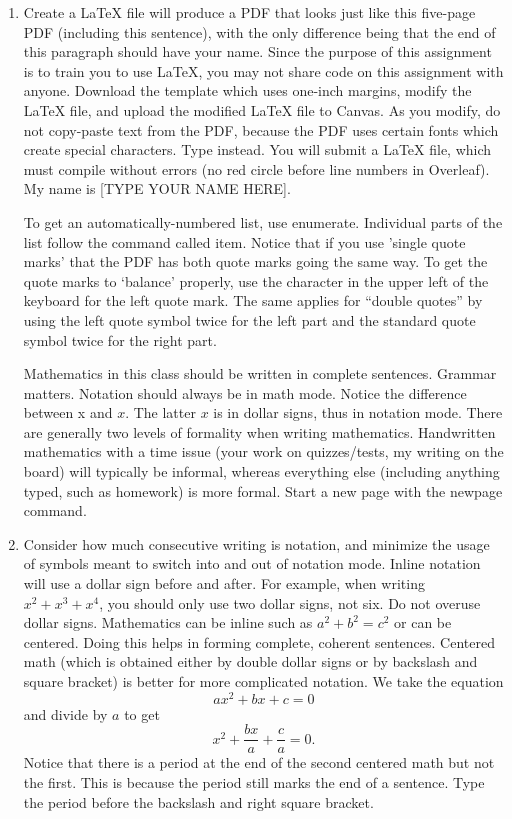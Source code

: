 \documentclass{article}
\begin{document}
\begin{enumerate}

\item Create a LaTeX file will produce a PDF that looks just like this five-page PDF (including this sentence), with the only difference being that the end of this paragraph should have your name. Since the purpose of this assignment is to train you to use LaTeX, you may not share code on this assignment with anyone. Download the template which uses one-inch margins, modify the LaTeX file, and upload the modified LaTeX file to Canvas. As you modify, do not copy-paste text from the PDF, because the PDF uses certain fonts which create special characters. Type instead. You will submit a LaTeX file, which must compile without errors (no red circle before line numbers in Overleaf). My name is [TYPE YOUR NAME HERE].

To get an automatically-numbered list, use enumerate. Individual parts of the list follow the command called item. Notice that if you use 'single quote marks' that the PDF has both quote marks going the same way. To get the quote marks to `balance' properly, use the character in the upper left of the keyboard for the left quote mark. The same applies for ``double quotes'' by using the left quote symbol twice for the left part and the standard quote symbol twice for the right part.

Mathematics in this class should be written in complete sentences. Grammar matters. Notation should always be in math mode. Notice the difference between x and $x$. The latter $x$ is in dollar signs, thus in notation mode. There are generally two levels of formality when writing mathematics. Handwritten mathematics with a time issue (your work on quizzes/tests, my writing on the board) will typically be informal, whereas everything else (including anything typed, such as homework) is more formal. Start a new page with the newpage command.

\newpage

\item Consider how much consecutive writing is notation, and minimize the usage of symbols meant to switch into and out of notation mode. Inline notation will use a dollar sign before and after. For example, when writing $x^2+x^3+x^4$, you should only use two dollar signs, not six. Do not overuse dollar signs. Mathematics can be inline such as $a^2+b^2=c^2$ or can be centered. Doing this helps in forming complete, coherent sentences. Centered math (which is obtained either by double dollar signs or by backslash and square bracket) is better for more complicated notation. We take the equation
\[ ax^2+bx+c=0\]
and divide by $a$ to get
\[ x^2+\frac{bx}{a}+\frac{c}{a}=0.\]
Notice that there is a period at the end of the second centered math but not the first. This is because the period still marks the end of a sentence. Type the period before the backslash and right square bracket.


\end{enumerate}
\end{document}
